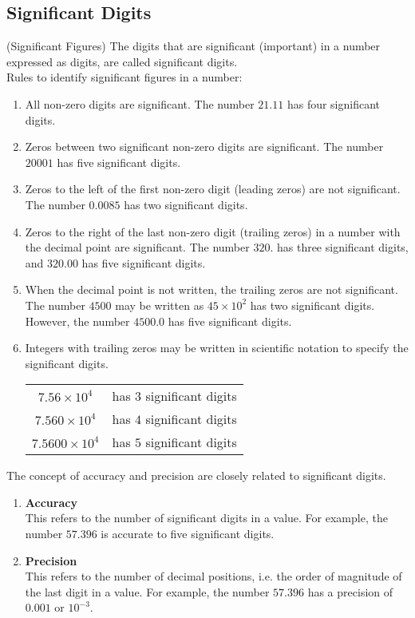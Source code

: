 \documentclass[aima203_lecturenotes_ku.tex]{subfiles}
\begin{document}
\subsection{Significant Digits} (Significant Figures)
The digits that are significant (important) in a number expressed as digits, are called significant digits. \\[2mm]
Rules to identify significant figures in a number:
\begin{enumerate}
\item All non-zero digits are significant. The number $21.11$ has four significant digits.

\item Zeros between two significant non-zero digits are significant. The number $20001$ has five significant digits.

\item Zeros to the left of the first non-zero digit (leading zeros) are not significant. The number $0.0085$ has two significant digits.

\item Zeros to the right of the last non-zero digit (trailing zeros) in a number with the decimal point are significant. The number $320.$ has three significant digits, and $320.00$ has five significant digits.

\item When the decimal point is not written, the trailing zeros are not significant. The number $4500$ may be written as $45 \times 10^2$ has two significant digits. However, the number $4500.0$ has five significant digits.

\item Integers with trailing zeros may be written in scientific notation to specify the significant digits.
  \begin{table}[h]
    \centering
    \begin{tabular}{|c|r|}
      \hline
      $7.56 \times 10^4$ & has $3$ significant digits \\[1mm]
      $7.560 \times 10^4$ & has $4$ significant digits \\[1mm]
      $7.5600 \times 10^4$ & has $5$ significant digits \\
      \hline
    \end{tabular}
  \end{table}
\end{enumerate}
The concept of accuracy and precision are closely related to significant digits.
\begin{enumerate}
\item \textbf{Accuracy} \\[1mm]
  This refers to the number of significant digits in a value. For example, the number $57.396$ is accurate to five significant digits.
\item \textbf{Precision} \\[1mm]
  This refers to the number of decimal positions, i.e. the order of magnitude of the last digit in a value. For example, the number $57.396$ has a precision of $0.001$ or $10^{-3}$.
\end{enumerate}
\end{document}
